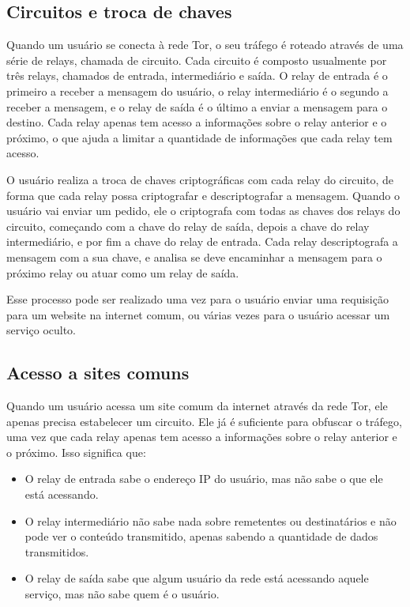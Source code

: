 \subsection{Circuitos e troca de chaves}

Quando um usuário se conecta à rede Tor, o seu tráfego é roteado através de uma série de relays, chamada de circuito. Cada circuito é composto usualmente por três relays, chamados de entrada, intermediário e saída. O relay de entrada é o primeiro a receber a mensagem do usuário, o relay intermediário é o segundo a receber a mensagem, e o relay de saída é o último a enviar a mensagem para o destino. Cada relay apenas tem acesso a informações sobre o relay anterior e o próximo, o que ajuda a limitar a quantidade de informações que cada relay tem acesso.

O usuário realiza a troca de chaves criptográficas com cada relay do circuito, de forma que cada relay possa criptografar e descriptografar a mensagem. Quando o usuário vai enviar um pedido, ele o criptografa com todas as chaves dos relays do circuito, começando com a chave do relay de saída, depois a chave do relay intermediário, e por fim a chave do relay de entrada. Cada relay descriptografa a mensagem com a sua chave, e analisa se deve encaminhar a mensagem para o próximo relay ou atuar como um relay de saída.

Esse processo pode ser realizado uma vez para o usuário enviar uma requisição para um website na internet comum, ou várias vezes para o usuário acessar um serviço oculto.

\subsection{Acesso a sites comuns}

Quando um usuário acessa um site comum da internet através da rede Tor, ele apenas precisa estabelecer um circuito. Ele já é suficiente para obfuscar o tráfego, uma vez que cada relay apenas tem acesso a informações sobre o relay anterior e o próximo. Isso significa que:

\begin{itemize}
    \item O relay de entrada sabe o endereço IP do usuário, mas não sabe o que ele está acessando.
    \item O relay intermediário não sabe nada sobre remetentes ou destinatários e não pode ver o conteúdo transmitido, apenas sabendo a quantidade de dados transmitidos.
    \item O relay de saída sabe que algum usuário da rede está acessando aquele serviço, mas não sabe quem é o usuário.
\end{itemize}

